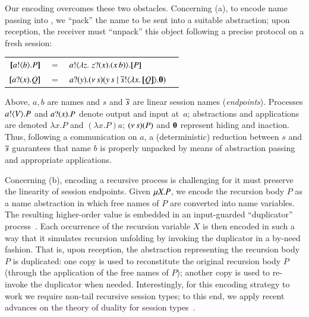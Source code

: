 \noi
Our encoding overcomes these two obstacles. 
Concerning (a), %
to encode name passing into \HO, 
we ``pack''
the name to be sent into a suitable abstraction; 
upon reception, the receiver must ``unpack'' this object following a precise protocol on a fresh  session:
\begin{center}
\begin{tabular}{rcll}
  $[\!\![a ! \langle b \rangle . P]\!\!]$	&$=$&	$a ! \langle  \lambda z.\,\,z ? (x) . (x\, {b})  \rangle . [\!\![P]\!\!]$ \\
  $[\!\![a ? (x) . Q]\!\!]$	&$=$&	$a ? (y) . (\nu\, s)(y\, {s} \;|\; \overline{s} ! \langle \lambda x.\,[\!\![Q]\!\!] \rangle . \mathbf{0})$
\end{tabular}
\end{center}
Above, 
$a,b$ are names and $s$ and $\overline{s}$ are 
linear session names (\emph{endpoints}).
Processes $a ! \langle V \rangle . P$ and 
$a ? (x) . P$ denote output and input at~$a$;   
abstractions and applications are denoted
$\lambda x.P$ and $(\lambda x.P)a$; %
$(\nu\, s)(P)$ and $\mathbf{0}$ represent hiding and inaction. %
Thus, following a communication on $a$, %
a (deterministic) reduction between  
$s$ and $\overline{s}$ guarantees that name $b$ is properly unpacked by means of abstraction passing
and appropriate applications.



Concerning (b), encoding a recursive process  is  challenging for 
it must preserve the linearity of session endpoints. 
Given $\mu X. P$, 
we encode the recursion body $P$ as a name abstraction
in which free names of $P$ are converted into name variables.
The resulting higher-order value is embedded in an input-guarded 
``duplicator'' process~\cite{ThomsenB:plachoasgcfhop}.
Each occurrence of the recursion variable $X$ is then encoded 
in such a way that it
simulates recursion unfolding by 
invoking the duplicator in a by-need fashion.
That is, upon reception, the abstraction representing the 
recursion body $P$
is duplicated: 
one copy is used to reconstitute the original recursion body $P$ (through
the application of the free names of $P$); 
another copy is used to re-invoke the duplicator when needed. 
Interestingly, for this encoding strategy to work 
we require non-tail recursive session types; to this end, 
we apply recent advances on the theory of duality for session types~\cite{TGC14,DBLP:journals/corr/abs-1202-2086}.

